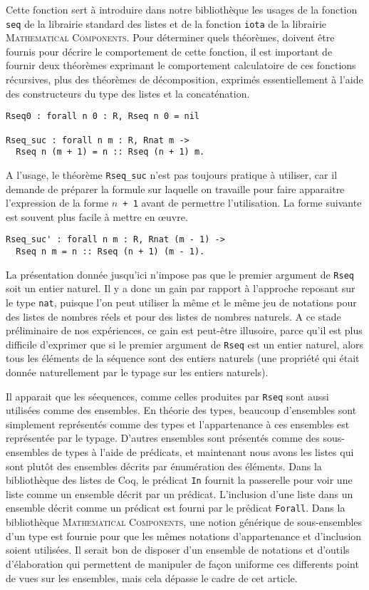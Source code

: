 \documentclass[draft]{jflart}
\newcommand{\mathcomp}{\textsc{Mathematical Components}}
\begin{document}
Cette fonction sert à introduire dans notre bibliothèque les usages
de la fonction \texttt{seq} de la librairie standard des listes et de la
fonction \texttt{iota} de la librairie \mathcomp{}.  Pour déterminer
quels théorèmes, doivent être fournis pour décrire le comportement de
cette fonction, il est important de fournir deux théorèmes exprimant
le comportement calculatoire de ces fonctions récursives, plus des
théorèmes de décomposition, exprimés essentiellement à l'aide des
constructeurs du type des listes et la concaténation.
\begin{verbatim}
Rseq0 : forall n 0 : R, Rseq n 0 = nil

Rseq_suc : forall n m : R, Rnat m ->
  Rseq n (m + 1) = n :: Rseq (n + 1) m.
\end{verbatim}
A l'usage, le théorème \texttt{Rseq\_suc} n'est pas toujours pratique à
utiliser, car il demande de préparer la formule sur laquelle on
travaille pour faire apparaitre l'expression de la forme \texttt{\(n\) +
  1} avant de permettre l'utilisation.  La forme suivante est souvent
plus facile à mettre en œuvre.
\begin{verbatim}
Rseq_suc' : forall n m : R, Rnat (m - 1) ->
  Rseq n m = n :: Rseq (n + 1) (m - 1).
\end{verbatim}
La présentation donnée jusqu'ici n'impose pas que le premier argument
de \texttt{Rseq} soit un entier naturel.  Il y a donc un gain par rapport
à l'approche reposant sur le type \texttt{nat}, puisque l'on peut
utiliser la même et le même jeu de notations pour des listes de
nombres réels et pour des listes de nombres naturels.  A ce stade
préliminaire de nos expériences, ce gain est peut-être illusoire,
parce qu'il est plus difficile d'exprimer que si le premier argument
de \texttt{Rseq} est un entier naturel, alors tous les éléments de la
séquence sont des entiers naturels (une propriété qui était donnée
naturellement par le typage sur les entiers naturels).

Il apparait que les séequences, comme celles produites par
\texttt{Rseq} sont aussi utilisées comme des ensembles.  En théorie des
types, beaucoup d'ensembles sont simplement représentés comme des
types et l'appartenance à ces ensembles est représentée par le typage.
D'autres ensembles sont présentés comme des sous-ensembles de types à
l'aide de prédicats, et maintenant nous avons les listes qui sont
plutôt des ensembles décrits par énumération des éléments.  Dans la
bibliothèque des listes de Coq, le prédicat \texttt{In} fournit la
passerelle pour voir une liste comme un ensemble décrit par un prédicat.
L'inclusion d'une liste dans un
ensemble décrit comme un prédicat est fourni par le prédicat
\texttt{Forall}.  Dans la bibliothèque \mathcomp{}, une notion générique
de sous-ensembles d'un type est fournie pour que les mêmes notations
d'appartenance et d'inclusion soient utilisées.  Il serait bon de
disposer d'un ensemble de notations et d'outils d'élaboration qui
permettent de manipuler de façon uniforme ces differents point de vues
sur les ensembles, mais cela dépasse le cadre de cet article.
\end{document}
